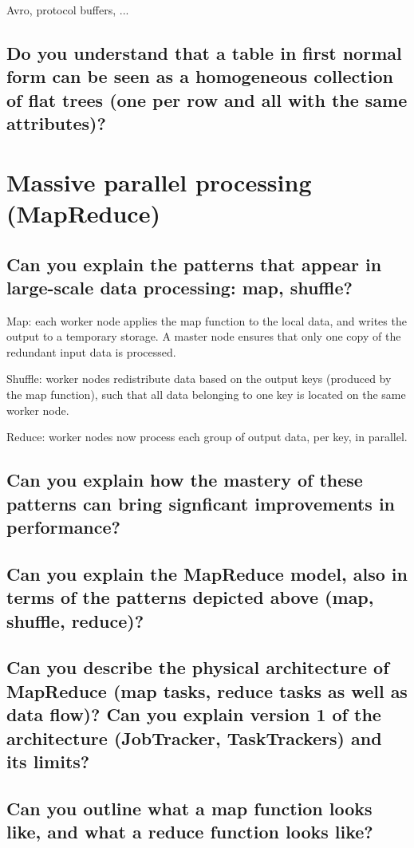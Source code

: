 \documentclass{article}
\begin{document}
Avro, protocol buffers, ...

\subsection{Do you understand that a table in first normal form can be seen as a homogeneous collection of flat trees (one per row and all with the same attributes)?}



\pagebreak

\section{Massive parallel processing (MapReduce)}
\subsection{Can you explain the patterns that appear in large-scale data processing: map, shuffle?}

Map: each worker node applies the map function to the local data, and writes the output to a temporary storage. A master node ensures that only one copy of the redundant input data is processed.

Shuffle: worker nodes redistribute data based on the output keys (produced by the map function), such that all data belonging to one key is located on the same worker node.

Reduce: worker nodes now process each group of output data, per key, in parallel.

\subsection{Can you explain how the mastery of these patterns can bring signficant improvements in performance?}

\subsection{Can you explain the MapReduce model, also in terms of the patterns depicted above (map, shuffle, reduce)?}
\subsection{Can you describe the physical architecture of MapReduce (map tasks, reduce tasks as well as data flow)? Can you explain version 1 of the architecture (JobTracker, TaskTrackers) and its limits?}
\subsection{Can you outline what a map function looks like, and what a reduce function looks like?}
\end{document}
